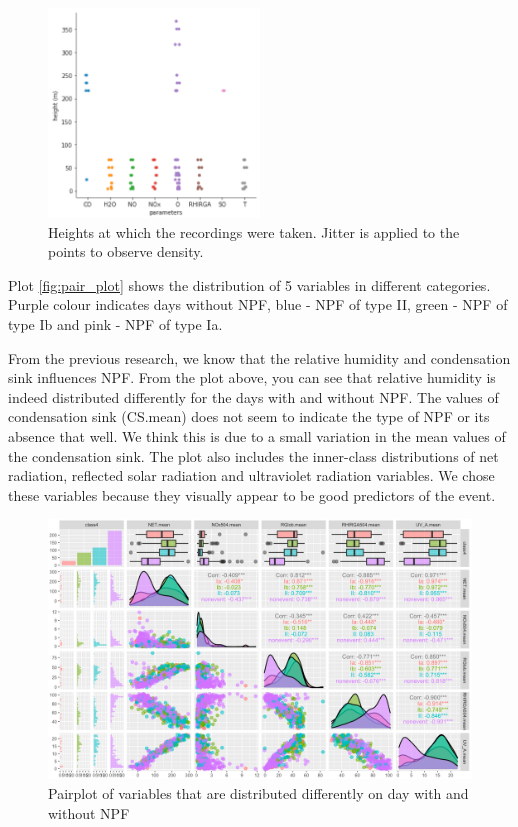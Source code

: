 \begin{figure}
   \centering
   \includegraphics[width=0.5\textwidth]{images/height.png}
   \caption{Heights at which the recordings were taken. Jitter is applied to the points to observe density.}
   \label{fig:height}
\end{figure}

Plot \ref{fig:pair_plot} shows the distribution of 5 variables in different categories. Purple colour indicates days without NPF, blue - NPF of type II, green - NPF of type Ib and pink - NPF of type Ia.

From the previous research, we know that the relative humidity and condensation sink influences NPF. From the plot above, you can see that relative humidity is indeed distributed differently for the days with and without NPF. The values of condensation sink (CS.mean) does not seem to indicate the type of NPF or its absence that well. We think this is due to a small variation in the mean values of the condensation sink. The plot also includes the inner-class distributions of net radiation, reflected solar radiation and ultraviolet radiation variables. We chose these variables because they visually appear to be good predictors of the event. 

\begin{figure}
   \centering
   \includegraphics[width=\textwidth]{images/pair_plot.png}
   \caption{Pairplot of variables that are distributed differently on day with and without NPF}
   \label{fig:height}
\end{figure}


